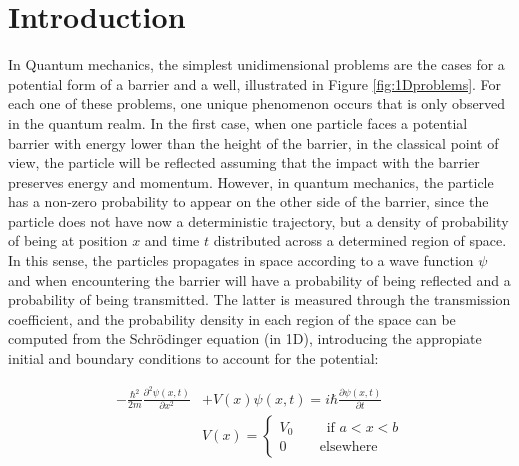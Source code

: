 \documentclass[12pt,a4paper,onecolumn]{article}
\theoremstyle{definition}
\theoremstyle{plain}
\begin{document}
\section{Introduction}
In Quantum mechanics, the simplest unidimensional problems are the cases for a potential form of a barrier and a well, illustrated in Figure \ref {fig:1Dproblems}. For each one of these problems, one unique phenomenon occurs that is only observed in the quantum realm. In the first case, when one particle faces a potential barrier with energy lower than the height of the barrier, in the classical point of view, the particle will be reflected assuming that the impact with the barrier preserves energy and momentum. However, in quantum mechanics, the particle has a non-zero probability to appear on the other side of the barrier, since the particle does not have now a deterministic trajectory, but a density of probability of being at position $x$ and time $t$ distributed across a determined region of space. In this sense, the particles propagates in space according to a wave function $\psi$ and when encountering the barrier will have a probability of being reflected and a probability of being transmitted. The latter is measured through the transmission coefficient, and the probability density in each region of the space can be computed from the Schrödinger equation (in 1D), introducing the appropiate initial and boundary conditions to account for the potential: 

\begin{align}
    -\frac{\hbar^2}{2m}\frac{\partial^2\psi(x,t)}{\partial x^2 }&+V(x)\psi(x,t)=i\hbar \frac{\partial \psi(x,t)}{\partial t} \\
    &V(x)=
\begin{cases}
V_0\hspace{1cm} \text{if } a<x<b\\
0\hspace{1cm} \text{elsewhere}
\end{cases}
\end{align}
\end{document}
